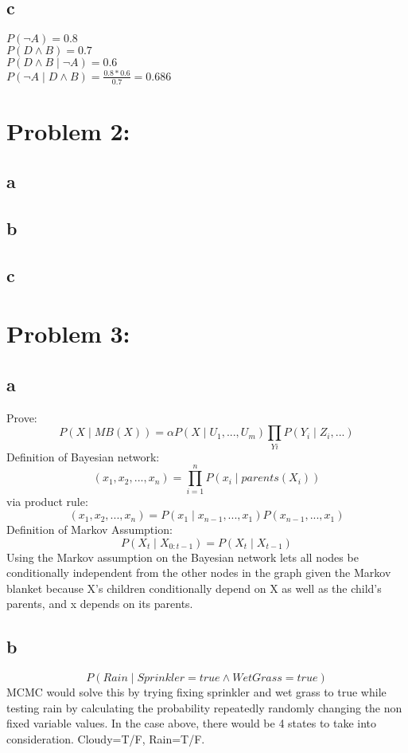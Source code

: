 \documentclass[11pt, oneside]{article}   	%
\begin{document}
\begin{flushleft}
\subsection*{c}
$P(\neg A)=0.8$\\
$P(D \wedge B)=0.7$\\
$P(D \wedge B \mid \neg A)=0.6$\\
$P(\neg A \mid D \wedge B)=\frac{0.8*0.6}{0.7}=0.686$\\
\section*{Problem 2:}
\subsection*{a}
\subsection*{b}
\subsection*{c}
\section*{Problem 3:}
\subsection*{a}
Prove:
$$P(X \mid MB(X)) = \alpha P(X \mid U_{1}, ..., U_{m}) \prod_{Yi} P(Y_{i} \mid Z_{i}, ...)$$
Definition of Bayesian network:
$$(x_{1},x_{2},...,x_{n})=\prod_{i=1}^{n} P(x_{i} \mid parents(X_{i}))$$
via product rule:
$$(x_{1},x_{2},...,x_{n})=P(x_{1} \mid x_{n-1}, ..., x_{1})P(x_{n-1},...,x_{1})$$
Definition of Markov Assumption:
$$P(X_{t} \mid X_{0:t-1}) = P(X_{t} \mid X_{t-1})$$
Using the Markov assumption on the Bayesian network lets all nodes be conditionally independent from the other nodes in the graph given the Markov blanket because X's children  conditionally depend on X as well as the child's parents, and x depends on its parents.
\subsection*{b}
$$P(Rain \mid Sprinkler=true \wedge WetGrass=true)$$
MCMC would solve this by trying fixing sprinkler and wet grass to true while testing rain by calculating the probability repeatedly randomly changing the non fixed variable values. In the case above, there would be 4 states to take into consideration. Cloudy=T/F, Rain=T/F.

\end{flushleft}
\end{document}
